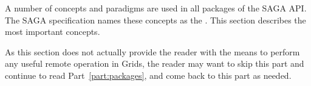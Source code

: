 

 A number of concepts and paradigms are used in all packages of
 the SAGA API.  The SAGA specification names these concepts as
 the .  This section describes the most
 important concepts.

 As this section does not actually provide the reader with the means to
 perform any useful remote operation in Grids, the reader may
 want to skip this part and continue to read Part~\ref{part:packages}, and come back to this
 part as needed.


